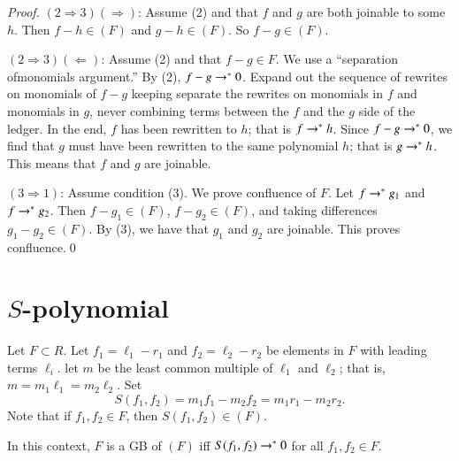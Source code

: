 \documentclass{llncs}
\begin{document}
\begin{proof}
$(2\Rightarrow 3)(\Rightarrow)$:  Assume (2) and that $f$ and $g$ are both joinable to some $h$.  Then $f-h\in (F)$ and $g-h\in (F)$.  So $f-g\in (F)$.

$(2\Rightarrow 3)(\Leftarrow)$:  Assume (2) and that $f-g\in F$.  We use a ``separation ofmonomials argument.''   By (2), $f-g\rightarrow^* 0$.  Expand out the sequence of rewrites on monomials of $f-g$ keeping separate the rewrites on monomials in $f$ and monomials in $g$, never combining terms between the $f$ and the $g$ side of the ledger.  In the end, $f$ has been rewritten to $h$; that is $f\rightarrow^* h$.  Since $f-g\rightarrow^* 0$, we find that $g$ must have been rewritten to the same polynomial $h$; that is $g\rightarrow^* h$.  This means that $f$ and $g$ are joinable.

$(3\Rightarrow 1)$:  Assume condition (3).  We prove confluence of $F$.  Let $f\rightarrow^* g_1$ and $f\rightarrow^* g_2$.  Then $f-g_1\in (F)$, $f-g_2\in (F)$, and taking differences $g_1-g_2\in (F)$.  By (3), we have that $g_1$ and $g_2$ are joinable.  This proves confluence.\qed
\end{proof}

\section{$S$-polynomial}

Let $F\subset R$.
Let $f_1=\ell_1-r_1$ and $f_2=\ell_2-r_2$ be elements in $F$ with leading terms $\ell_i$.
let $m$ be the least common multiple of $\ell_1$ and $\ell_2$; that is,
$m = m_1\ell_1 = m_2\ell_2$.  Set 
\[
S(f_1,f_2) = m_1 f_1 - m_2 f_2 = m_1 r_1 - m_2 r_2.
\]
Note that if $f_1,f_2\in F$, then $S(f_1,f_2)\in (F)$.

\begin{lemma} In this context, $F$ is a GB
of $(F)$ iff $S(f_1,f_2)\rightarrow^*  0$ for all $f_1,f_2\in F$.
\end{lemma}
\end{document}
